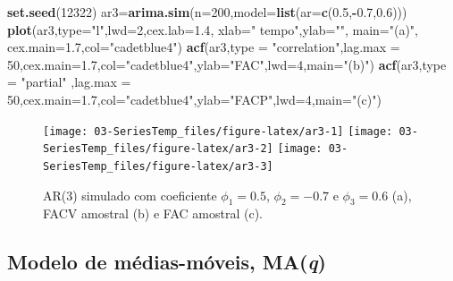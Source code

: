 \documentclass[
]{book}
\newenvironment{Shaded}{\begin{snugshade}}{\end{snugshade}}
\newcommand{\DataTypeTok}[1]{\textcolor[rgb]{0.13,0.29,0.53}{#1}}
\newcommand{\DecValTok}[1]{\textcolor[rgb]{0.00,0.00,0.81}{#1}}
\newcommand{\FloatTok}[1]{\textcolor[rgb]{0.00,0.00,0.81}{#1}}
\newcommand{\KeywordTok}[1]{\textcolor[rgb]{0.13,0.29,0.53}{\textbf{#1}}}
\newcommand{\NormalTok}[1]{#1}
\newcommand{\OperatorTok}[1]{\textcolor[rgb]{0.81,0.36,0.00}{\textbf{#1}}}
\newcommand{\StringTok}[1]{\textcolor[rgb]{0.31,0.60,0.02}{#1}}
\theoremstyle{definition}
\theoremstyle{definition}
\theoremstyle{definition}
\theoremstyle{remark}
\begin{document}
\begin{Shaded}
\begin{Highlighting}[]
\KeywordTok{set.seed}\NormalTok{(}\DecValTok{12322}\NormalTok{)}
\NormalTok{ar3=}\KeywordTok{arima.sim}\NormalTok{(}\DataTypeTok{n=}\DecValTok{200}\NormalTok{,}\DataTypeTok{model=}\KeywordTok{list}\NormalTok{(}\DataTypeTok{ar=}\KeywordTok{c}\NormalTok{(}\FloatTok{0.5}\NormalTok{,}\OperatorTok{-}\FloatTok{0.7}\NormalTok{,}\FloatTok{0.6}\NormalTok{)))}
\KeywordTok{plot}\NormalTok{(ar3,}\DataTypeTok{type=}\StringTok{"l"}\NormalTok{,}\DataTypeTok{lwd=}\DecValTok{2}\NormalTok{,}\DataTypeTok{cex.lab=}\FloatTok{1.4}\NormalTok{, }\DataTypeTok{xlab=}\StringTok{" tempo"}\NormalTok{,}\DataTypeTok{ylab=}\StringTok{""}\NormalTok{, }\DataTypeTok{main=}\StringTok{"(a)"}\NormalTok{, }\DataTypeTok{cex.main=}\FloatTok{1.7}\NormalTok{,}\DataTypeTok{col=}\StringTok{"cadetblue4"}\NormalTok{)}
\KeywordTok{acf}\NormalTok{(ar3,}\DataTypeTok{type =} \StringTok{"correlation"}\NormalTok{,}\DataTypeTok{lag.max =} \DecValTok{50}\NormalTok{,}\DataTypeTok{cex.main=}\FloatTok{1.7}\NormalTok{,}\DataTypeTok{col=}\StringTok{"cadetblue4"}\NormalTok{,}\DataTypeTok{ylab=}\StringTok{"FAC"}\NormalTok{,}\DataTypeTok{lwd=}\DecValTok{4}\NormalTok{,}\DataTypeTok{main=}\StringTok{"(b)"}\NormalTok{)}
\KeywordTok{acf}\NormalTok{(ar3,}\DataTypeTok{type =} \StringTok{"partial"}\NormalTok{ ,}\DataTypeTok{lag.max =} \DecValTok{50}\NormalTok{,}\DataTypeTok{cex.main=}\FloatTok{1.7}\NormalTok{,}\DataTypeTok{col=}\StringTok{"cadetblue4"}\NormalTok{,}\DataTypeTok{ylab=}\StringTok{"FACP"}\NormalTok{,}\DataTypeTok{lwd=}\DecValTok{4}\NormalTok{,}\DataTypeTok{main=}\StringTok{"(c)"}\NormalTok{)}
\end{Highlighting}
\end{Shaded}

\begin{figure}
\texttt{[image: 03-SeriesTemp\_files/figure-latex/ar3-1]} \texttt{[image: 03-SeriesTemp\_files/figure-latex/ar3-2]} \texttt{[image: 03-SeriesTemp\_files/figure-latex/ar3-3]} \caption{AR(3) simulado com coeficiente $\phi_1=0.5$, $\phi_2=-0.7$ e $\phi_3=0.6$   (a), FACV amostral (b) e FAC amostral (c).}\label{fig:ar3}
\end{figure}

\hypertarget{modelo-de-muxe9dias-muxf3veis-maq}{%
\subsection{\texorpdfstring{Modelo de médias-móveis, MA(\emph{q})}{Modelo de médias-móveis, MA(q)}}\label{modelo-de-muxe9dias-muxf3veis-maq}}
\end{document}
